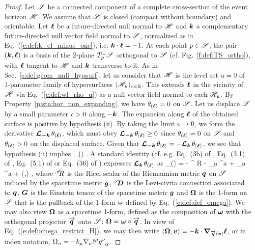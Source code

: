 \begin{proof}
Let $\mathscr{S}$ be a connected component of a complete cross-section of the event horizon $\mathscr{H}$.
We assume that $\mathscr{S}$ is closed (compact without boundary) and orientable.
Let $\bm{\ell}$ be a future-directed null normal to $\mathscr{H}$ and $\bm{k}$ a complementary
future-directed null vector field
normal to $\mathscr{S}$, normalized as in Eq.~(\ref{e:def:k_el_minus_one}), i.e.
$\bm{k}\cdot\bm{\ell} = -1$. At each point $p\in \mathscr{S}$, the pair $(\bm{k},\bm{\ell})$ is
a basis of the 2-plane $T_p^\perp\mathscr{S}$ orthogonal to $\mathscr{S}$ (cf. Fig.~\ref{f:def:TS_ortho}),
with $\bm{\ell}$ tangent to $\mathscr{H}$ and $\bm{k}$ transverse to it.
As in Sec.~\ref{s:def:geom_null_hypsurf}, let us consider that $\mathscr{H}$
is the level set $u=0$ of 1-parameter family of hypersurfaces $(\mathscr{H}_u)_{u\in\mathbb{R}}$.
This extends $\bm{\ell}$ in the vicinity of $\mathscr{H}$ via Eq.~(\ref{e:def:wl_rho_u})
as a null vector field normal to each $\mathscr{H}_u$.
By Property~\ref{p:sta:hor_non_expanding}, we have $\theta_{(\bm{\ell})} = 0$
on $\mathscr{S}$. Let us displace $\mathscr{S}$ by a small parameter $\epsilon>0$ along $-\bm{k}$. The expansion along $\bm{\ell}$ of the obtained surface is
positive by hypothesis (ii). By taking the limit $\epsilon\to 0$, we form the
derivative $\bm{\mathcal{L}}_{\bm{-k}}\, \theta_{(\bm{\ell})}$, which must obey
$\bm{\mathcal{L}}_{\bm{-k}}\, \theta_{(\bm{\ell})} \geq 0$ since $\theta_{(\bm{\ell})} = 0$ on $\mathscr{S}$ and
$\theta_{(\bm{\ell})} > 0$ on the displaced surface. Given that
$\bm{\mathcal{L}}_{\bm{-k}}\, \theta_{(\bm{\ell})} = -\bm{\mathcal{L}}_{\bm{k}}\, \theta_{(\bm{\ell})}$, we see that hypothesis
(ii) implies
\be \label{e:sta:Lie_k_l}
     \theta_{(\wl)}  .
\ee
A standard identity (cf. e.g. Eq.~(3b) of \cite{Haywa94}, Eq.~(3.1) of \cite{BoothF07},
Eq.~(5.1) of \cite{Cao11} or Eq.~(36) of \cite{Jaram13})
expresses $\bm{\mathcal{L}}_{\bm{k}}\,\theta_{(\bm{\ell})}$ as
\be \label{e:sta:Lie_k_theta_l}
     \theta_{(\wl)} = -  {}^\Sp\!\! R - \DSc_a \Omega^a
    +  \Omega_a \Omega^a + (\wl,) ,
\ee
where ${}^{\mathscr{S}}\!\! R$ is the Ricci scalar of the Riemannian metric $\bm{q}$ on
$\mathscr{S}$ induced by the spacetime metric $\bm{g}$, ${}^{\mathscr{S}}\!\!\bm{D}$ is the Levi-civita
connection associated to $\bm{q}$,
$\bm{G}$ is the Einstein tensor
of the spacetime metric $\bm{g}$ and $\bm{\Omega}$ is the 1-form on $\mathscr{S}$
that is the pullback of the 1-form $\bm{\omega}$ defined by Eq.~(\ref{e:def:def_omega}).
We may also view $\bm{\Omega}$ as a spacetime 1-form, defined as
the composition of $\bm{\omega}$ with the orthogonal projector $\overrightarrow{\bm{q}}$ onto
$\mathscr{S}$: $\bm{\Omega} = \bm{\omega} \circ \overrightarrow{\bm{q}}$.
In view of Eq.~(\ref{e:def:omega_restrict_H}), we may then write
$\langle\bm{\Omega}, \bm{v} \rangle = - \bm{k} \cdot\bm{\nabla}_{\overrightarrow{\bm{q}}(\bm{v})} \bm{\ell}$,
or in index notation, $\Omega_\alpha  = - k_\mu \nabla_\nu \ell^\mu q^\nu_{\ \, \alpha}$.

\end{proof}
